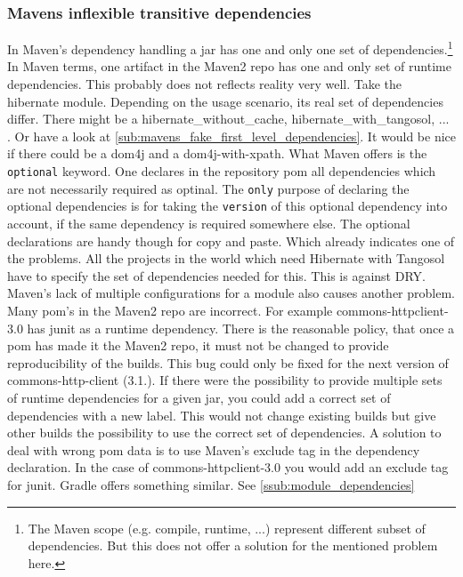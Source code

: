 \subsubsection{Mavens inflexible transitive dependencies}
In Maven’s dependency handling a jar has one and only one set of dependencies.\footnote{The Maven scope (e.g. compile, runtime, ...) represent different subset of dependencies. But this does not offer a solution for the mentioned problem here.} In Maven terms, one artifact in the Maven2 repo has one and only set of runtime dependencies. This probably does not reflects reality very well. Take the hibernate module. Depending on the usage scenario, its real set of dependencies differ. There might be a hibernate\_without\_cache, hibernate\_with\_tangosol, ... . Or have a look at \ref{sub:mavens_fake_first_level_dependencies}. It would be nice if there could be a dom4j and a dom4j-with-xpath. What Maven offers is the \texttt{optional} keyword. One declares in the repository pom all dependencies which are not necessarily required as optinal. The \texttt{only} purpose of declaring the optional dependencies is for taking the \texttt{version} of this optional dependency into account, if the same dependency is required somewhere else. The optional declarations are handy though for copy and paste. Which already indicates one of the problems. All the projects in the world which need Hibernate with Tangosol have to specify the set of dependencies needed for this. This is against DRY. 
Maven's lack of multiple configurations for a module also causes another problem. Many pom's in the Maven2 repo are incorrect. For example commons-httpclient-3.0 has junit as a runtime dependency. There is the reasonable policy, that once a pom has made it the Maven2 repo, it must not be changed to provide reproducibility of the builds. This bug could only be fixed for the next version of commons-http-client (3.1.). If there were the possibility to provide multiple sets of runtime dependencies for a given jar, you could add a correct set of dependencies with a new label. This would not change existing builds but give other builds the possibility to use the correct set of dependencies. A solution to deal with wrong pom data is to use Maven's exclude tag in the dependency declaration. In the case of commons-httpclient-3.0 you would add an exclude tag for junit. Gradle offers something similar. See \ref{ssub:module_dependencies}

